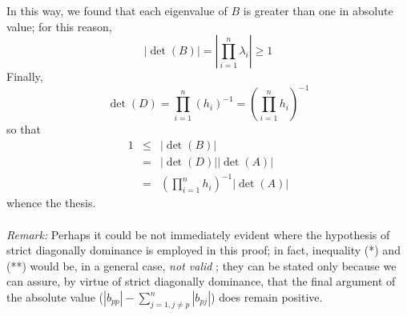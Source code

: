 \documentclass[12pt]{article}
\begin{document}
In this way, we found that each eigenvalue of $B$ is greater than one in
absolute value; for this reason,%
\[
\left\vert \det (B)\right\vert =\left\vert \prod_{i=1}^{n}\lambda
_{i}\right\vert \geq 1
\]
Finally,%
\[
\det (D)=\prod_{i=1}^{n}\left( h_{i}\right) ^{-1}=\left(
\prod_{i=1}^{n}h_{i}\right) ^{-1}
\]
so that 
\begin{eqnarray*}
1 &\leq &\left\vert \det (B)\right\vert  \\
&=&\left\vert \det (D)\right\vert \left\vert \det (A)\right\vert  \\
&=&\left( \prod_{i=1}^{n}h_{i}\right) ^{-1}\left\vert \det (A)\right\vert 
\end{eqnarray*}
whence the thesis.\\ \\
\textit{Remark:} Perhaps it could be not immediately evident where the
hypothesis of strict diagonally dominance is employed in this proof; in
fact, inequality (*) and (**) would be, in a general case, \textit{not valid}%
; they can be stated only because we can assure, by virtue of strict
diagonally dominance, that the final argument of the absolute value ($%
\left\vert b_{pp}\right\vert -\sum_{j=1,j\neq p}^{n}\left\vert
b_{pj}\right\vert $) does remain positive.
\end{document}
